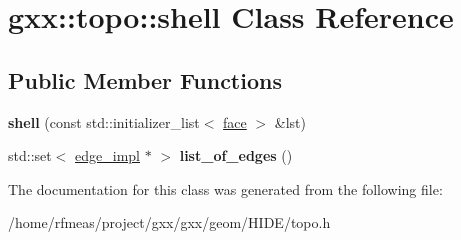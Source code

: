 \hypertarget{classgxx_1_1topo_1_1shell}{}\section{gxx\+:\+:topo\+:\+:shell Class Reference}
\label{classgxx_1_1topo_1_1shell}
\subsection*{Public Member Functions}
\begin{DoxyCompactItemize}
\item 
{\bfseries shell} (const std\+::initializer\+\_\+list$<$ \hyperlink{classgxx_1_1topo_1_1face}{face} $>$ \&lst)\hypertarget{classgxx_1_1topo_1_1shell_a99ab7ac6d757886c5f84db9366da8c37}{}\label{classgxx_1_1topo_1_1shell_a99ab7ac6d757886c5f84db9366da8c37}

\item 
std\+::set$<$ \hyperlink{classgxx_1_1topo_1_1edge__impl}{edge\+\_\+impl} $\ast$ $>$ {\bfseries list\+\_\+of\+\_\+edges} ()\hypertarget{classgxx_1_1topo_1_1shell_a5225668d904107f3ca6fc03ce09a47eb}{}\label{classgxx_1_1topo_1_1shell_a5225668d904107f3ca6fc03ce09a47eb}

\end{DoxyCompactItemize}


The documentation for this class was generated from the following file\+:\begin{DoxyCompactItemize}
\item 
/home/rfmeas/project/gxx/gxx/geom/\+H\+I\+D\+E/topo.\+h\end{DoxyCompactItemize}
